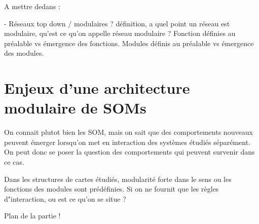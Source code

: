 A mettre dedans : 

- Réseaux top down / modulaires ? définition, a quel point un réseau est modulaire, qu'est ce qu'on appelle réseau modulaire ? 
Fonction définies au préalable vs émergence des fonctions. 
Modules définis au préalable vs émergence des modules. 




\section{Enjeux d'une architecture modulaire de SOMs}

On connait plutot bien les SOM, mais on sait que des comportements nouveaux peuvent émerger lorsqu'on met en interaction des systèmes étudiés séparément. 
On peut donc se poser la question des comportements qui peuvent survenir dans ce cas.

Dans les structures de cartes étudiés, modularité forte dans le sens ou les fonctions des modules sont prédéfinies. Si on ne fournit que les règles d"interaction, ou est ce qu'on se situe ? 
 

Plan de la partie ! 

 


